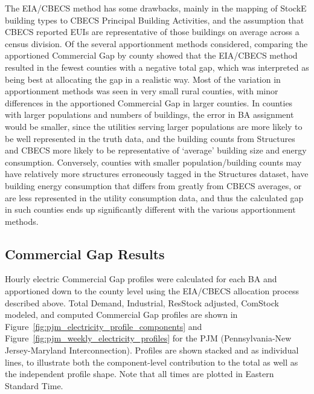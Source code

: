 The EIA/CBECS method has some drawbacks, mainly in the mapping of StockE building types to CBECS Principal Building Activities, and the assumption that CBECS reported EUIs are representative of those buildings on average across a census division. Of the several apportionment methods considered, comparing the apportioned Commercial Gap by county showed that the EIA/CBECS method resulted in the fewest counties with a negative total gap, which was interpreted as being best at allocating the gap in a realistic way. Most of the variation in apportionment methods was seen in very small rural counties, with minor differences in the apportioned Commercial Gap in larger counties.  In counties with larger populations and numbers of buildings, the error in BA assignment would be smaller, since the utilities serving larger populations are more likely to be well represented in the truth data, and the building counts from Structures and CBECS more likely to be representative of ‘average’ building size and energy consumption. Conversely, counties with smaller population/building counts may have relatively more structures erroneously tagged in the Structures dataset, have building energy consumption that differs from greatly from CBECS averages, or are less represented in the utility consumption data, and thus the calculated gap in such counties ends up significantly different with the various apportionment methods.

\subsection{Commercial Gap Results}
Hourly electric Commercial Gap profiles were calculated for each BA and apportioned down to the county level using the EIA/CBECS allocation process described above. Total Demand, Industrial, ResStock adjusted, ComStock modeled, and computed Commercial Gap profiles are shown in Figure~\ref{fig:pjm_electricity_profile_components} and Figure~\ref{fig:pjm_weekly_electricity_profiles} for the PJM (Pennsylvania-New Jersey-Maryland Interconnection). Profiles are shown stacked and as individual lines, to illustrate both the component-level contribution to the total as well as the independent profile shape. Note that all times are plotted in Eastern Standard Time.

